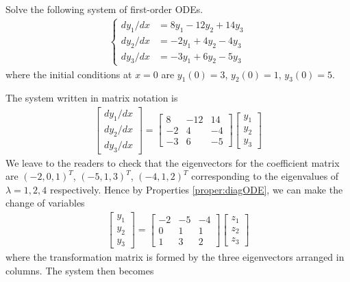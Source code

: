 \begin{exmp}
Solve the following system of first-order ODEs.
\begin{align*}
\begin{cases}
dy_1/dx &= 8y_1 - 12y_2 + 14y_3 \\
dy_2/dx &= -2y_1 + 4y_2 - 4y_3 \\
dy_3/dx &= -3y_1 + 6y_2 - 5y_3 
\end{cases}    
\end{align*}
where the initial conditions at $x=0$ are $y_1(0) = 3$, $y_2(0) = 1$, $y_3(0) = 5$.
\end{exmp}
\begin{solution}
The system written in matrix notation is
\begin{align*}
\begin{bmatrix}
dy_1/dx \\
dy_2/dx \\
dy_3/dx
\end{bmatrix}
=
\begin{bmatrix}
8 & -12 & 14 \\
-2 & 4 & -4 \\
-3 & 6 & -5
\end{bmatrix}
\begin{bmatrix}
y_1 \\
y_2 \\
y_3
\end{bmatrix}
\end{align*}
We leave to the readers to check that the eigenvectors for the coefficient matrix are $(-2,0,1)^T$, $(-5,1,3)^T$, $(-4,1,2)^T$ corresponding to the eigenvalues of $\lambda = 1, 2, 4$ respectively. Hence by Properties \ref{proper:diagODE}, we can make the change of variables
\begin{align*}
\begin{bmatrix}
y_1 \\
y_2 \\
y_3
\end{bmatrix}
=
\begin{bmatrix}
-2 & -5 & -4 \\
0 & 1 & 1 \\
1 & 3 & 2
\end{bmatrix}
\begin{bmatrix}
z_1 \\
z_2 \\
z_3
\end{bmatrix}
\end{align*}
where the transformation matrix is formed by the three eigenvectors arranged in columns. The system then becomes

\end{solution}
